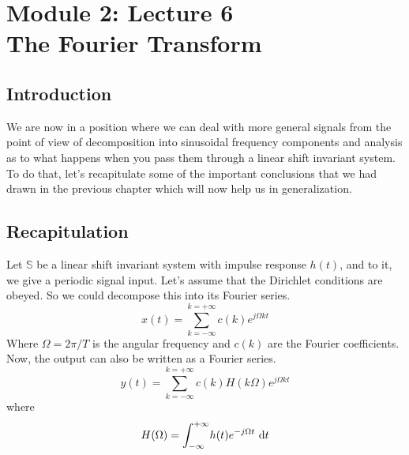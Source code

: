 \section{Module 2: Lecture 6\\The Fourier Transform}

\subsection{Introduction}
We are now in a position where we can deal with more general signals from the point of view of decomposition into sinusoidal frequency components and analysis as to what happens when you pass them through a linear shift invariant system. To do that, let's recapitulate some of the important conclusions that we had drawn in the previous chapter which will now help us in generalization.
\subsection{Recapitulation}
Let $\mathbb{S}$ be a linear shift invariant system with impulse response $h(t)$, and to it, we give a periodic signal input. Let’s assume that the Dirichlet conditions are obeyed. So we could decompose this into its Fourier series.
\begin{equation*}
x(t)= \sum\limits_{k=-\infty}^{k=+\infty}c(k)e^{j\Omega kt}
\end{equation*}
Where $\Omega=2\pi /T$ is the angular frequency and $c(k)$ are the Fourier coefficients. Now, the output can also be written as a Fourier series.
\begin{equation*}
y(t)= \sum\limits_{k=-\infty}^{k=+\infty}c(k)H(k\Omega)e^{j\Omega kt}
\end{equation*}
where
\begin{equation*}
H(\Omega)= \int_{-\infty}^{+\infty} \! h(t)e^{-j\Omega t} \ \mathrm{d} t
\end{equation*}
